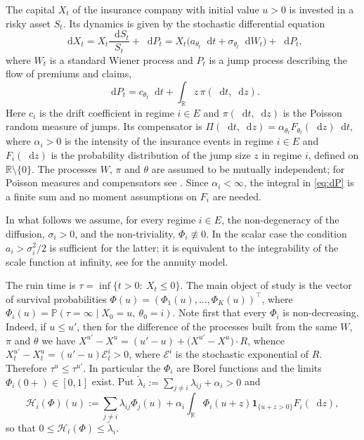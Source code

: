 \documentclass[smallextended]{svjour3}
\newcommand{\bbr}{\mathbb{R}}
\newcommand{\bbp}{\mathbb{P}}
\newcommand{\Ind}{\mathbf{1}}
\newcommand{\diff}{\mathop{}\!\mathrm{d}}
\begin{document}
The capital $X_t$ of the insurance company with initial value $u>0$ is
invested in a risky asset $S_t$. Its dynamics is given by the stochastic
differential equation
\begin{equation}
    \diff X_t = X_t\frac{\diff S_t}{S_t}+\diff P_t
    = X_t\bigl(a_{\theta_t}\diff t+\sigma_{\theta_t}\diff W_t\bigr)+\diff P_t,
\end{equation}
where $W_t$ is a standard Wiener process and $P_t$ is a jump process
describing the flow of premiums and claims,
\begin{equation}
    \label{eq:dP}
    \diff P_t = c_{\theta_t}\diff t+\int_{\bbr} z\,\pi(\diff t,\diff z).
\end{equation}
Here $c_i$ is the drift coefficient in regime $i\in E$ and
$\pi(\diff t,\diff z)$ is the Poisson random measure of jumps. Its compensator
is $\Pi(\diff t,\diff z)=\alpha_{\theta_t}F_{\theta_t}(\diff z)\diff t$, where
$\alpha_i>0$ is the intensity of the insurance events in regime $i\in E$ and
$F_i(\diff z)$ is the probability distribution of the jump size $z$ in regime
$i$, defined on $\bbr\setminus\{0\}$. The processes $W$, $\pi$ and $\theta$ are
assumed to be mutually independent; for Poisson measures and compensators see
\cite{Sato}. Since $\alpha_i<\infty$, the integral in \eqref{eq:dP} is a finite
sum and no moment assumptions on $F_i$ are needed.

In what follows we assume, for every regime $i\in E$, the non-degeneracy of the
diffusion, $\sigma_i>0$, and the non-triviality, $\Phi_i\not\equiv0$. In the
scalar case the condition $a_i>\sigma_i^2/2$ is sufficient for the latter; it
is equivalent to the integrability of the scale function at infinity, see
\cite{Kabanov} for the annuity model.

The ruin time is $\tau=\inf\{t>0:\ X_t\le0\}$. The main object of study is the
vector of survival probabilities
$\Phi(u)=(\Phi_1(u),\dots,\Phi_K(u))^\top$, where
$\Phi_i(u)=\bbp(\tau=\infty\mid X_0=u,\ \theta_0=i)$. Note first that every
$\Phi_i$ is non-decreasing. Indeed, if $u\le u'$, then for the difference of
the processes built from the same $W$, $\pi$ and $\theta$ we have
$X^{u'}-X^{u}=(u'-u)+\bigl(X^{u'}-X^{u}\bigr)\cdot R$, whence
$X^{u'}_t-X^{u}_t=(u'-u)\mathcal E^i_t>0$, where $\mathcal E^i$ is the
stochastic exponential of $R$. Therefore $\tau^{u}\le\tau^{u'}$. In particular
the $\Phi_i$ are Borel functions and the limits $\Phi_i(0+)\in[0,1]$ exist.
Put $\tilde\lambda_i:=\sum_{j\ne i}\lambda_{ij}+\alpha_i>0$ and
$$
    \mathcal H_i(\Phi)(u) := \sum_{j\ne i}\lambda_{ij}\Phi_j(u)
    + \alpha_i\!\int_{\bbr}\!\Phi_i(u+z)\Ind_{\{u+z>0\}}F_i(\diff z),
$$
so that $0\le\mathcal H_i(\Phi)\le\tilde\lambda_i$.
\end{document}
